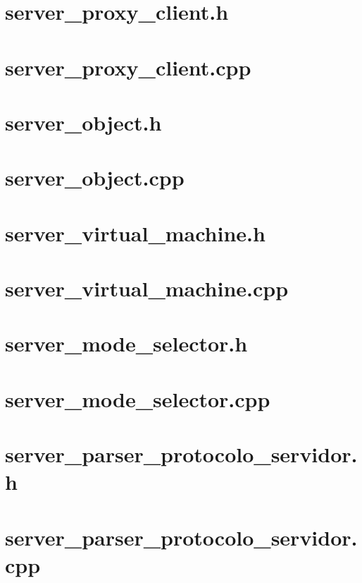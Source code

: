 \documentclass{article}
\begin{document}
\section{ server\_proxy\_client.h }

\newpage
\section{ server\_proxy\_client.cpp }

\newpage
\section{ server\_object.h }

\newpage
\section{ server\_object.cpp }

\newpage
\section{ server\_virtual\_machine.h }

\newpage
\section{ server\_virtual\_machine.cpp }

\newpage
\section{ server\_mode\_selector.h }

\newpage
\section{ server\_mode\_selector.cpp }

\newpage
\section{ server\_parser\_protocolo\_servidor.h }

\newpage
\section{ server\_parser\_protocolo\_servidor.cpp }

\end{document}
